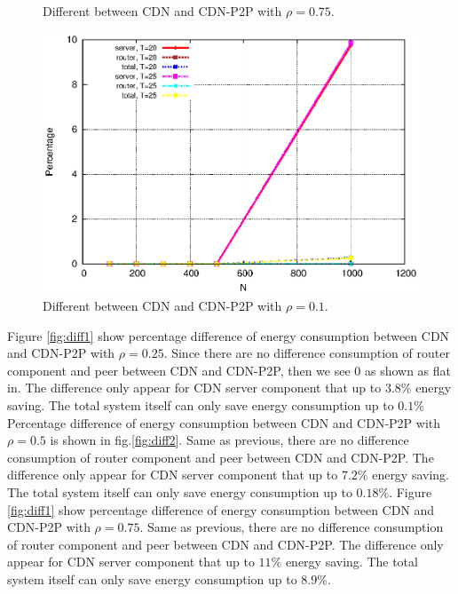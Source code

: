 \documentclass[JIP]{ipsj}
\begin{document}
\begin{figure}[t]
\begin{minipage}[b]{0.45\linewidth}
	\caption{Different between CDN and CDN-P2P with $\rho=0.75$.}
	\label{fig:diff3}
\end{minipage}
\hfill
\begin{minipage}[b]{0.45\linewidth}
	\includegraphics[scale=0.5]{graphs/diff-4.eps}
	\caption{Different between CDN and CDN-P2P with $\rho=0.1$.}
	\label{fig:diff4}
\end{minipage}
\label{fig:maindiff}
\end{figure}

Figure \ref{fig:diff1} show percentage difference of energy consumption between CDN and CDN-P2P with $\rho=0.25$. 
Since there are no difference consumption of router component and peer between CDN and CDN-P2P, then we see $0$ as shown as flat in.  
The difference only appear for CDN server component that up to $3.8\%$ energy saving. 
The total system itself can only save energy consumption up to $0.1\%$
Percentage difference of energy consumption between CDN and CDN-P2P with $\rho=0.5$ is shown in fig.\ref{fig:diff2}.
Same as previous, there are no difference consumption of router component and peer between CDN and CDN-P2P.
The difference only appear for CDN server component that up to $7.2\%$ energy saving. 
The total system itself can only save energy consumption up to $0.18\%$.
Figure \ref{fig:diff1} show percentage difference of energy consumption between CDN and CDN-P2P with $\rho=0.75$.
Same as previous, there are no difference consumption of router component and peer between CDN and CDN-P2P.
The difference only appear for CDN server component that up to $11\%$ energy saving. 
The total system itself can only save energy consumption up to $8.9\%$.
\end{document}
